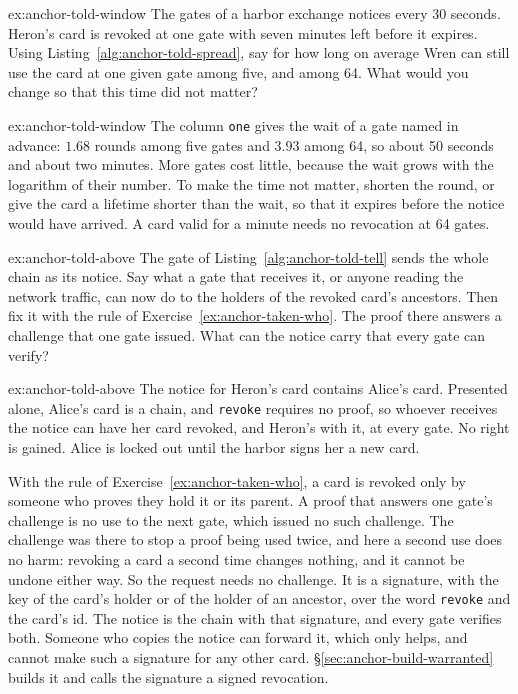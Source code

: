 \documentclass[11pt,a4paper]{article}
\theoremstyle{definition}
\begin{document}
\begin{pdexercise}[kind=Trace,rating=2]{ex:anchor-told-window}
The gates of a harbor exchange notices every 30 seconds. Heron's card is revoked at one gate with seven minutes left before it expires. Using Listing~\ref{alg:anchor-told-spread}, say for how long on average Wren can still use the card at one given gate among five, and among 64. What would you change so that this time did not matter?
\end{pdexercise}
\begin{pdsolution}{ex:anchor-told-window}
The column \texttt{one} gives the wait of a gate named in advance: $1.68$ rounds among five gates and $3.93$ among 64, so about 50 seconds and about two minutes. More gates cost little, because the wait grows with the logarithm of their number. To make the time not matter, shorten the round, or give the card a lifetime shorter than the wait, so that it expires before the notice would have arrived. A card valid for a minute needs no revocation at 64 gates.
\end{pdsolution}

\begin{pdexercise}[kind=Open,rating=3]{ex:anchor-told-above}
The gate of Listing~\ref{alg:anchor-told-tell} sends the whole chain as its notice. Say what a gate that receives it, or anyone reading the network traffic, can now do to the holders of the revoked card's ancestors. Then fix it with the rule of Exercise~\ref{ex:anchor-taken-who}. The proof there answers a challenge that one gate issued. What can the notice carry that every gate can verify?
\end{pdexercise}
\begin{pdsolution}{ex:anchor-told-above}
The notice for Heron's card contains Alice's card. Presented alone, Alice's card is a chain, and \texttt{revoke} requires no proof, so whoever receives the notice can have her card revoked, and Heron's with it, at every gate. No right is gained. Alice is locked out until the harbor signs her a new card.

With the rule of Exercise~\ref{ex:anchor-taken-who}, a card is revoked only by someone who proves they hold it or its parent. A proof that answers one gate's challenge is no use to the next gate, which issued no such challenge. The challenge was there to stop a proof being used twice, and here a second use does no harm: revoking a card a second time changes nothing, and it cannot be undone either way. So the request needs no challenge. It is a signature, with the key of the card's holder or of the holder of an ancestor, over the word \texttt{revoke} and the card's id. The notice is the chain with that signature, and every gate verifies both. Someone who copies the notice can forward it, which only helps, and cannot make such a signature for any other card. \S\ref{sec:anchor-build-warranted} builds it and calls the signature a signed revocation.
\end{pdsolution}
\end{document}
